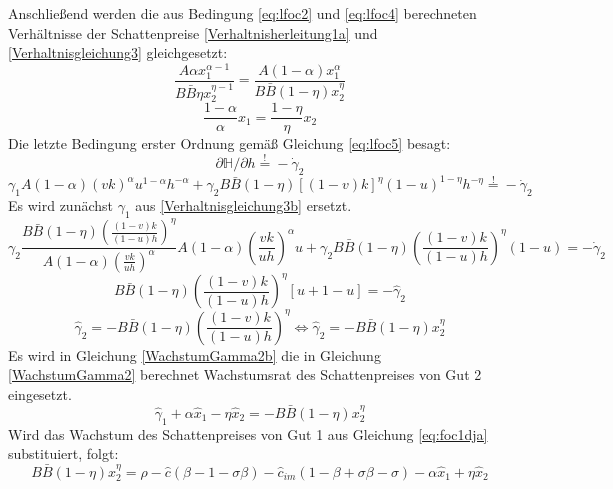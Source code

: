 Anschlie{\ss}end werden die aus Bedingung \eqref{eq:lfoc2} und \eqref{eq:lfoc4} berechneten Verhältnisse der Schattenpreise \eqref{Verhaltnisherleitung1a} und \eqref{Verhaltnisgleichung3} gleichgesetzt: 
\begin{equation}
\frac{A\alpha x_1^{\alpha-1}}{B\bar{B}\eta x_2^{\eta-1}}=\frac{A(1-\alpha)x_1^{\alpha}}{B\bar{B}(1-\eta)x_2^\eta}
\end{equation}
\begin{equation}
\boxed{\frac{1-\alpha}{\alpha}x_1=\frac{1-\eta}{\eta}x_2}
\end{equation}
Die letzte Bedingung erster Ordnung gemä{\ss} Gleichung \eqref{eq:lfoc5} besagt:
\begin{equation*}
\partial\mathbb{H}/\partial h\overset{!}{=}-\dot{\gamma}_2
\end{equation*}
\begin{equation}
\gamma_1A(1-\alpha)(vk)^\alpha u^{1-\alpha}h^{-\alpha}+\gamma_2 B\bar{B}(1-\eta)[(1-v)k]^{\eta}(1-u)^{1-\eta}h^{-\eta}\overset{!}{=}-\dot{\gamma}_2
\end{equation}
Es wird zunächst $\gamma_1$ aus \eqref{Verhaltnisgleichung3b} ersetzt. 
\begin{equation*}
\gamma_2\frac{B\bar{B}(1-\eta)\left(\frac{(1-v)k}{(1-u)h}\right)^\eta}{A(1-\alpha)\left(\frac{vk}{uh}\right)^{\alpha}}A(1-\alpha)\left(\frac{vk}{uh}\right)^{\alpha}u+\gamma_2 B\bar{B}(1-\eta)\left(\frac{(1-v)k}{(1-u)h}\right)^\eta(1-u)=-\dot{\gamma}_2
\end{equation*}
\begin{equation*}
B\bar{B}(1-\eta)\left(\frac{(1-v)k}{(1-u)h}\right)^\eta[u+1-u]=-\hat{\gamma}_2
\end{equation*}
\begin{equation}
\hat{\gamma}_2=-B\bar{B}(1-\eta)\left(\frac{(1-v)k}{(1-u)h}\right)^\eta\Longleftrightarrow \hat{\gamma}_2=-B\bar{B}(1-\eta)x_2^\eta\label{WachstumGamma2b}
\end{equation}
Es wird in Gleichung \eqref{WachstumGamma2b} die in Gleichung \eqref{WachstumGamma2} berechnet Wachstumsrat des Schattenpreises von Gut 2 eingesetzt.
\begin{equation}
\hat{\gamma}_{1}+\alpha\hat{x}_1-\eta\hat{x}_2 =-B\bar{B}(1-\eta)x_2^\eta
\end{equation} 
Wird das Wachstum des Schattenpreises von Gut 1 aus Gleichung \eqref{eq:foc1dja} substituiert, folgt: 
\begin{equation}
\boxed{B\bar{B}(1-\eta)x_2^\eta=\rho-\hat{c}(\beta-1-\sigma\beta)-\hat{c}_{im}(1-\beta+\sigma\beta-\sigma)-\alpha\hat{x}_1+\eta\hat{x}_2}
\end{equation}
